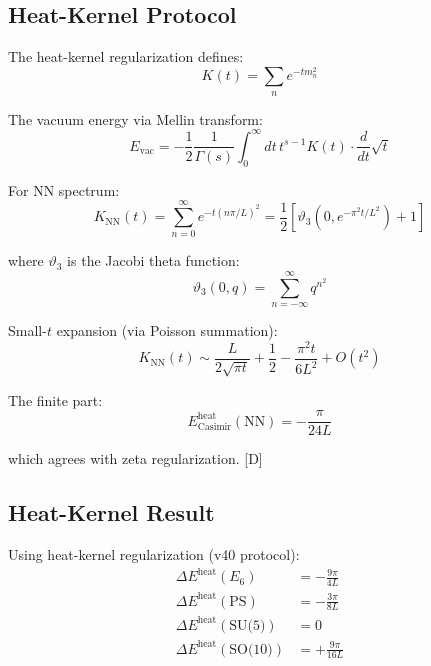 \documentclass[11pt,a4paper]{article}
\newcommand{\tagD}{\textcolor{blue!70!black}{[D]}}
\begin{document}
\subsection{Heat-Kernel Protocol}

The heat-kernel regularization defines:
\begin{equation}
\label{eq:heat-protocol-def}
K(t) = \sum_n e^{-t m_n^2}
\end{equation}

The vacuum energy via Mellin transform:
\begin{equation}
\label{eq:heat-mellin}
E_{\text{vac}} = -\frac{1}{2} \frac{1}{\Gamma(s)} \int_0^\infty dt\, t^{s-1} K(t) \cdot \frac{d}{dt} \sqrt{t}
\end{equation}

For NN spectrum:
\begin{equation}
\label{eq:heat-nn}
K_{\text{NN}}(t) = \sum_{n=0}^\infty e^{-t(n\pi/L)^2} = \frac{1}{2}\left[\vartheta_3(0, e^{-\pi^2 t/L^2}) + 1\right]
\end{equation}

where $\vartheta_3$ is the Jacobi theta function:
\begin{equation}
\label{eq:jacobi-theta}
\vartheta_3(0, q) = \sum_{n=-\infty}^\infty q^{n^2}
\end{equation}

Small-$t$ expansion (via Poisson summation):
\begin{equation}
\label{eq:heat-small-t}
K_{\text{NN}}(t) \sim \frac{L}{2\sqrt{\pi t}} + \frac{1}{2} - \frac{\pi^2 t}{6L^2} + O(t^2)
\end{equation}

The finite part:
\begin{equation}
\label{eq:heat-finite}
E_{\text{Casimir}}^{\text{heat}}(\text{NN}) = -\frac{\pi}{24L}
\end{equation}

which agrees with zeta regularization. \tagD

\subsection{Heat-Kernel Result}

Using heat-kernel regularization (v40 protocol):
\begin{align}
\label{eq:heat-e6}
\Delta E^{\text{heat}}(E_6) &= -\frac{9\pi}{4L} \\
\label{eq:heat-ps}
\Delta E^{\text{heat}}(\text{PS}) &= -\frac{3\pi}{8L} \\
\label{eq:heat-su5}
\Delta E^{\text{heat}}(\text{SU(5)}) &= 0 \\
\label{eq:heat-so10}
\Delta E^{\text{heat}}(\text{SO(10)}) &= +\frac{9\pi}{16L}
\end{align}
\end{document}
